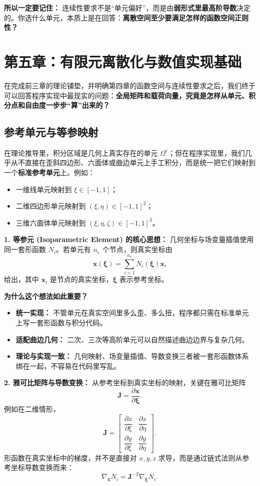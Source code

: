 \documentclass[11pt, a4paper, UTF8]{ctexart}
\begin{document}
\textbf{所以一定要记住：}
连续性要求不是“单元偏好”，而是由\textbf{弱形式里最高阶导数}决定的。你选什么单元，本质上是在回答：\textbf{离散空间至少要满足怎样的函数空间正则性？}

\section{第五章：有限元离散化与数值实现基础}
在完成前三章的理论铺垫，并明确第四章的函数空间与连续性要求之后，我们终于可以回答程序实现中最现实的问题：\textbf{全局矩阵和载荷向量，究竟是怎样从单元、积分点和自由度一步步“算”出来的？}

\subsection{参考单元与等参映射}
在理论推导里，积分区域是几何上真实存在的单元 $\Omega^e$；但在程序实现里，我们几乎从不直接在歪斜四边形、六面体或曲边单元上手工积分，而是统一把它们映射到一个\textbf{标准参考单元}上。例如：
\begin{itemize}
    \item 一维线单元映射到 $\xi \in [-1,1]$；
    \item 二维四边形单元映射到 $(\xi,\eta)\in[-1,1]^2$；
    \item 三维六面体单元映射到 $(\xi,\eta,\zeta)\in[-1,1]^3$。
\end{itemize}

\textbf{1. 等参元 (Isoparametric Element) 的核心思想：}
几何坐标与场变量插值使用同一套形函数 $N_i$。若单元有 $n_e$ 个节点，则真实坐标由
\[
\bm{x}(\bm{\xi}) = \sum_{i=1}^{n_e} N_i(\bm{\xi}) \bm{x}_i
\]
给出，其中 $\bm{x}_i$ 是节点的真实坐标，$\bm{\xi}$ 表示参考坐标。

\textbf{为什么这个想法如此重要？}
\begin{itemize}
    \item \textbf{统一实现：} 不管单元在真实空间里多么歪、多么扭，程序都只需在标准单元上写一套形函数与积分代码。
    \item \textbf{适配曲边几何：} 二次、三次等高阶单元可以自然描述曲边边界与复杂几何。
    \item \textbf{理论与实现一致：} 几何映射、场变量插值、导数变换三者被一套形函数体系绑在一起，不容易在代码里写乱。
\end{itemize}

\textbf{2. 雅可比矩阵与导数变换：}
从参考坐标到真实坐标的映射，关键在雅可比矩阵
\[
\bm{J} = \frac{\partial \bm{x}}{\partial \bm{\xi}}.
\]
例如在二维情形，
\[
\bm{J} =
\begin{bmatrix}
\dfrac{\partial x}{\partial \xi} & \dfrac{\partial x}{\partial \eta} \\
\dfrac{\partial y}{\partial \xi} & \dfrac{\partial y}{\partial \eta}
\end{bmatrix}.
\]
形函数在真实坐标中的梯度，并不是直接对 $x,y,z$ 求导，而是通过链式法则从参考坐标导数变换而来：
\[
\nabla_{\bm{x}} N_i = \bm{J}^{-T} \nabla_{\bm{\xi}} N_i.
\]
\end{document}
